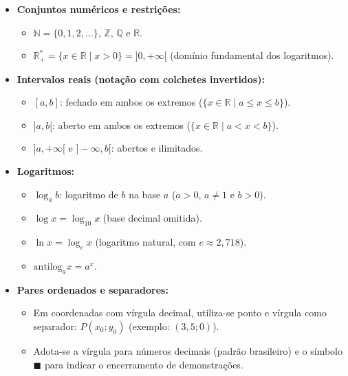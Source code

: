 \documentclass[12pt,a4paper]{report}
\begin{document}
	\begin{itemize}[label=$\circ$]
		\item \textbf{Conjuntos numéricos e restrições:}
		\begin{itemize}[label=--]
			\item $\mathbb{N} = \{0, 1, 2, \dots\}$, $\mathbb{Z}$, $\mathbb{Q}$ e $\mathbb{R}$.
			\item $\mathbb{R}^*_+ = \{x \in \mathbb{R} \mid x > 0\} = {]0, +\infty[}$ (domínio fundamental dos logaritmos).
		\end{itemize}
		
		\item \textbf{Intervalos reais (notação com colchetes invertidos):}
		\begin{itemize}[label=--]
			\item $[a, b]$: fechado em ambos os extremos ($\{x \in \mathbb{R} \mid a \leqslant x \leqslant b\}$).
			\item $]a, b[$: aberto em ambos os extremos ($\{x \in \mathbb{R} \mid a < x < b\}$).
			\item $]a, +\infty[$ e $]-\infty, b[$: abertos e ilimitados.
		\end{itemize}
		
		\item \textbf{Logaritmos:}
		\begin{itemize}[label=--]
			\item $\log_a b$: logaritmo de $b$ na base $a$ ($a > 0$, $a \neq 1$ e $b > 0$).
			\item $\log x = \log_{10} x$ (base decimal omitida).
			\item $\ln x = \log_e x$ (logaritmo natural, com $e \approx 2{,}718$).
			\item $\text{antilog}_a x = a^x$.
		\end{itemize}
		
		\item \textbf{Pares ordenados e separadores:}
		\begin{itemize}[label=--]
			\item Em coordenadas com vírgula decimal, utiliza-se ponto e vírgula como separador: $P(x_0; y_0)$ (exemplo: $(3{,}5; 0)$).
			\item Adota-se a vírgula para números decimais (padrão brasileiro) e o símbolo $\blacksquare$ para indicar o encerramento de demonstrações.
		\end{itemize}
	\end{itemize}	
	\clearpage
	
	\tableofcontents
	\thispagestyle{empty}
	
\end{document}
